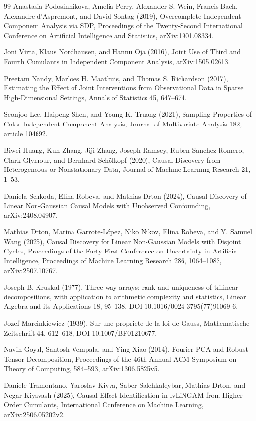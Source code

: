 \documentclass{article}
\begin{document}
\begin{thebibliography}{99}
   Anastasia Podosinnikova, Amelia Perry, Alexander S. Wein, Francis Bach, Alexandre d'Aspremont, and David Sontag (2019), Overcomplete Independent Component Analysis via SDP, Proceedings of the Twenty-Second International Conference on Artificial Intelligence and Statistics, arXiv:1901.08334.

   Joni Virta, Klaus Nordhausen, and Hannu Oja (2016), Joint Use of Third and Fourth Cumulants in Independent Component Analysis, arXiv:1505.02613.

   Preetam Nandy, Marloes H. Maathuis, and Thomas S. Richardson (2017), Estimating the Effect of Joint Interventions from Observational Data in Sparse High-Dimensional Settings, Annals of Statistics 45, 647--674.

   Seonjoo Lee, Haipeng Shen, and Young K. Truong (2021), Sampling Properties of Color Independent Component Analysis, Journal of Multivariate Analysis 182, article 104692.

   Biwei Huang, Kun Zhang, Jiji Zhang, Joseph Ramsey, Ruben Sanchez-Romero, Clark Glymour, and Bernhard Schölkopf (2020), Causal Discovery from Heterogeneous or Nonstationary Data, Journal of Machine Learning Research 21, 1--53.

   Daniela Schkoda, Elina Robeva, and Mathias Drton (2024), Causal Discovery of Linear Non-Gaussian Causal Models with Unobserved Confounding, arXiv:2408.04907.

   Mathias Drton, Marina Garrote-López, Niko Nikov, Elina Robeva, and Y. Samuel Wang (2025), Causal Discovery for Linear Non-Gaussian Models with Disjoint Cycles, Proceedings of the Forty-First Conference on Uncertainty in Artificial Intelligence, Proceedings of Machine Learning Research 286, 1064--1083, arXiv:2507.10767.

   Joseph B. Kruskal (1977), Three-way arrays: rank and uniqueness of trilinear decompositions, with application to arithmetic complexity and statistics, Linear Algebra and its Applications 18, 95--138, DOI 10.1016/0024-3795(77)90069-6.

   Jozef Marcinkiewicz (1939), Sur une propriete de la loi de Gauss, Mathematische Zeitschrift 44, 612--618, DOI 10.1007/BF01210677.

   Navin Goyal, Santosh Vempala, and Ying Xiao (2014), Fourier PCA and Robust Tensor Decomposition, Proceedings of the 46th Annual ACM Symposium on Theory of Computing, 584--593, arXiv:1306.5825v5.

   Daniele Tramontano, Yaroslav Kivva, Saber Salehkaleybar, Mathias Drton, and Negar Kiyavash (2025), Causal Effect Identification in lvLiNGAM from Higher-Order Cumulants, International Conference on Machine Learning, arXiv:2506.05202v2.

\end{thebibliography}
\end{document}
